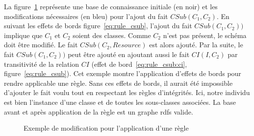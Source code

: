 \begin{example}
    La figure~\ref{fig:app_rule} représente une base de connaissance initiale (en noir) et les modifications nécessaires (en bleu) pour l'ajout du fait $CSub(C_1, C_2)$.
    En suivant les effets de bords figure~\ref{eq:rule_csub}, l'ajout du fait $CSub(C_1, C_2))$ implique que $C_1$ et $C_2$ soient des classes.
    Comme $C_2$ n'est pas présent, le schéma doit être modifié.
    Le fait $CSub(C_2, Resource)$ est alors ajouté.
    Par la suite, le fait $CSub(C_1, C_2))$ peut être ajouté en ajoutant aussi le fait $CI(I, C_2)$ par transitivité de la relation $CI$ (effet de bord~\ref{eq:rule_csub:ci}, figure~\ref{eq:rule_csub}).
    Cet exemple montre l'application d'effets de bords pour rendre applicable une règle.
    Sans ces effets de bords, il aurait été impossible d'ajouter le fait voulu tout en respectant les règles d'intégrités.
    Ici, notre individu est bien l'instance d'une classe et de toutes les sous-classes associées.
    La base avant et après application de la règle est un graphe \gls{rdfs} valide.
\end{example}

\begin{figure}[ht]
    \centering
    \caption{Exemple de modification pour l'application d'une règle}
    \label{fig:app_rule}
\end{figure}
